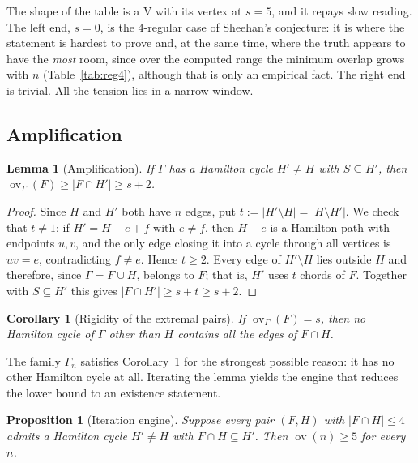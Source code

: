\documentclass[11pt,a4paper]{article}
\newtheorem{lemma}[theorem]{Lemma}
\newtheorem{proposition}[theorem]{Proposition}
\newtheorem{corollary}[theorem]{Corollary}
\theoremstyle{definition}
\theoremstyle{remark}
\newcommand{\ov}{\operatorname{ov}}
\begin{document}
The shape of the table is a V with its vertex at $s=5$, and it repays slow reading. The left end, $s=0$, is the $4$-regular case of Sheehan's conjecture: it is where the statement is hardest to prove and, at the same time, where the truth appears to have the \emph{most} room, since over the computed range the minimum overlap grows with $n$ (Table~\ref{tab:reg4}), although that is only an empirical fact. The right end is trivial. All the tension lies in a narrow window.

\subsection{Amplification}

\begin{lemma}[Amplification]\label{lem:amplify}
If $\Gamma$ has a Hamilton cycle $H'\ne H$ with $S\subseteq H'$, then $\ov_\Gamma(F)\ge|F\cap H'|\ge s+2$.
\end{lemma}

\begin{proof}
Since $H$ and $H'$ both have $n$ edges, put $t:=|H'\setminus H|=|H\setminus H'|$. We check that $t\ne1$: if $H'=H-e+f$ with $e\ne f$, then $H-e$ is a Hamilton path with endpoints $u,v$, and the only edge closing it into a cycle through all vertices is $uv=e$, contradicting $f\ne e$. Hence $t\ge2$. Every edge of $H'\setminus H$ lies outside $H$ and therefore, since $\Gamma=F\cup H$, belongs to $F$; that is, $H'$ uses $t$ chords of $F$. Together with $S\subseteq H'$ this gives $|F\cap H'|\ge s+t\ge s+2$.
\end{proof}

\begin{corollary}[Rigidity of the extremal pairs]\label{cor:rigidextr}
If $\ov_\Gamma(F)=s$, then no Hamilton cycle of $\Gamma$ other than $H$ contains all the edges of $F\cap H$.
\end{corollary}

The family $\Gamma_n$ satisfies Corollary~\ref{cor:rigidextr} for the strongest possible reason: it has no other Hamilton cycle at all. Iterating the lemma yields the engine that reduces the lower bound to an existence statement.

\begin{proposition}[Iteration engine]\label{prop:engine}
Suppose every pair $(F,H)$ with $|F\cap H|\le4$ admits a Hamilton cycle $H'\ne H$ with $F\cap H\subseteq H'$. Then $\ov(n)\ge5$ for every $n$.
\end{proposition}
\end{document}
